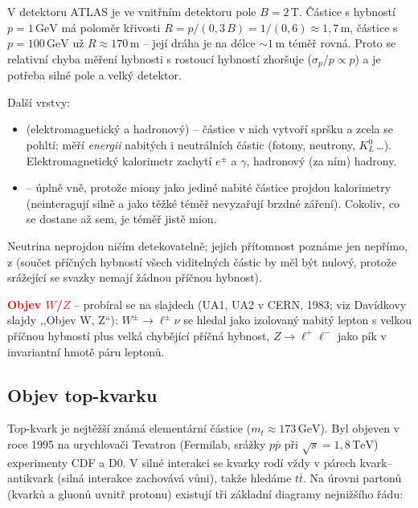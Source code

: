 \begin{priklad}[Odhad]
  V detektoru ATLAS je ve vnitřním detektoru pole \(B=2\,\mathrm{T}\). Částice s hybností
  \(p=1\,\mathrm{GeV}\) má poloměr křivosti \(R = p/(0{,}3\,B) = 1/(0{,}6)\approx 1{,}7\,\mathrm{m}\),
  částice s \(p=100\,\mathrm{GeV}\) už \(R\approx 170\,\mathrm{m}\) -- její dráha je na
  délce \(\sim 1\,\mathrm{m}\) téměř rovná. Proto se relativní chyba měření hybnosti
  s rostoucí hybností zhoršuje (\(\sigma_p/p\propto p\)) a je potřeba silné pole a velký
  detektor.
\end{priklad}

Další vrstvy:
\begin{itemize}[nosep]
  \item {} (elektromagnetický a hadronový) -- částice v nich vytvoří spršku
        a zcela se pohltí; měří \emph{energii} nabitých i neutrálních částic (fotony,
        neutrony, \(K^0_L\)\,\dots). Elektromagnetický kalorimetr zachytí \(e^\pm\) a \(\gamma\),
        hadronový (za ním) hadrony.
  \item {} -- úplně vně, protože miony jako jediné nabité částice
        projdou kalorimetry (neinteragují silně a jako těžké téměř nevyzařují brzdné záření).
        Cokoliv, co se dostane až sem, je téměř jistě mion.
\end{itemize}
Neutrina neprojdou ničím detekovatelně; jejich přítomnost poznáme jen nepřímo, z
 (součet příčných hybností všech viditelných částic by měl
být nulový, protože srážející se svazky nemají žádnou příčnou hybnost).

\textcolor{red}{\textbf{Objev \(W\)/\(Z\)}} -- probíral se na slajdech (UA1, UA2 v CERN, 1983;
viz Davídkovy slajdy ,,Objev W, Z``): \(W^\pm\to \ell^\pm\nu\) se hledal jako izolovaný nabitý
lepton s velkou příčnou hybností plus velká chybějící příčná hybnost, \(Z\to\ell^+\ell^-\)
jako pík v invariantní hmotě páru leptonů.

\subsection{Objev top-kvarku}

Top-kvark je nejtěžší známá elementární částice (\(m_t\approx 173\,\mathrm{GeV}\)). Byl objeven
v roce 1995 na urychlovači Tevatron (Fermilab, srážky \(p\bar p\) při \(\sqrt s = 1{,}8\,
\mathrm{TeV}\)) experimenty CDF a D0. V silné interakci se kvarky rodí vždy v párech
kvark--antikvark (silná interakce zachovává vůni), takže hledáme \(t\bar t\). Na úrovni
partonů (kvarků a gluonů uvnitř protonu) existují tři základní diagramy nejnižšího řádu:

